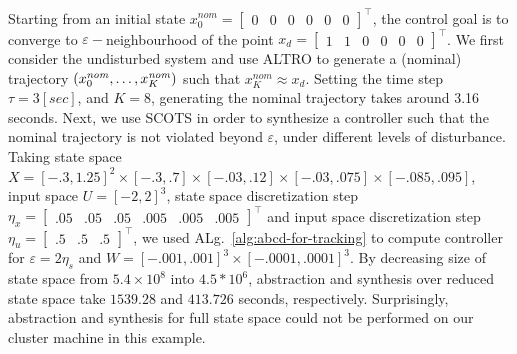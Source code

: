 Starting from an initial state $x_0^{nom}=\begin{bmatrix}0&0&0&0&0&0\end{bmatrix}^\top$, the control goal is to converge to $\varepsilon-$neighbourhood of the point 
$x_d=\begin{bmatrix}1&1&0&0&0&0\end{bmatrix}^\top$. We first consider the undisturbed system and use ALTRO to generate a (nominal) trajectory $(x_0^{\mathit{nom}},\ldots,x_K^{\mathit{nom}})$ such that $x_K^{nom}\approx x_d$. Setting the time step $\tau=3[sec]$, and $K=8$, generating the nominal trajectory takes around 3.16 seconds. Next, we use SCOTS in order to synthesize a controller such that the nominal trajectory is not violated beyond $\varepsilon$, under different levels of disturbance. Taking state space $X=[-.3,1.25]^2\times[-.3,.7]\times[-.03,.12]\times[-.03,.075]\times[-.085,.095]$, input space $U=[-2,2]^3$, state space discretization step $\eta_x=\begin{bmatrix}.05&.05&.05&.005&.005&.005\end{bmatrix}^\top$ and input space discretization step $\eta_u=\begin{bmatrix}.5&.5&.5\end{bmatrix}^\top$, we used ALg.~\ref{alg:abcd-for-tracking} to compute controller for $\varepsilon=2\eta_s$ and $W=[-.001,.001]^3\times[-.0001,.0001]^3$. By decreasing size of state space from $5.4\times 10^8$ into $4.5*10^6$, abstraction and synthesis over reduced state space take $1539.28$ and $413.726$ seconds, respectively. Surprisingly, abstraction and synthesis for full state space could not be performed on our cluster machine in this example.

